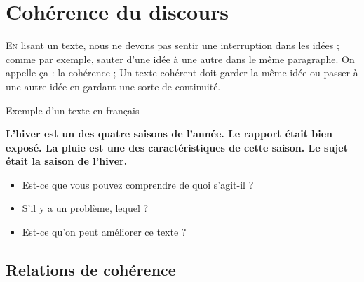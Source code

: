 \documentclass{KodeBook}
\begin{document}
		\mainmatter
	
\fi
\chapter{Cohérence du discours}

\begin{introduction}
	\lettrine{E}{n} lisant un texte, nous ne devons pas sentir une interruption dans les idées ; comme par exemple, sauter d'une idée à une autre dans le même paragraphe.
	On appelle ça : la cohérence ; Un texte cohérent doit garder la même idée ou passer à une autre idée en gardant une sorte de continuité.
\end{introduction} 

\begin{exampleblock}{Exemple d'un texte en français}
	\begin{center}
		\Large\bfseries
		L'hiver est un des quatre saisons de l'année. 
		Le rapport était bien exposé. 
		La pluie est une des caractéristiques de cette saison.
		Le sujet était la saison de l'hiver.
	\end{center}
\end{exampleblock}

\begin{itemize}
	\item Est-ce que vous pouvez comprendre de quoi s'agit-il ?
	\item S'il y a un problème, lequel ?
	\item Est-ce qu'on peut améliorer ce texte ?
\end{itemize}

\section{Relations de cohérence}
\end{document}
